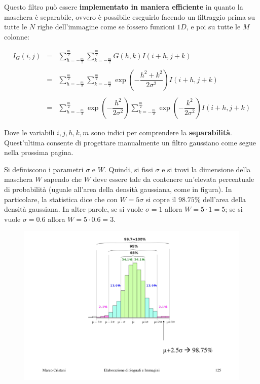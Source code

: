 \documentclass[a4paper]{article}
\begin{document}
	\noindent
	Questo filtro può essere \textbf{implementato in maniera efficiente} in quanto la maschera è separabile, ovvero è possibile eseguirlo facendo un filtraggio prima su tutte le $N$ righe dell'immagine come se fossero funzioni $1D$, e poi su tutte le $M$ colonne:
	
	\begin{equation*}
		\begin{array}{lll}
			I_{G}\left(i,j\right) & = & \displaystyle\sum_{h = -\frac{m}{2}}^{\frac{m}{2}} \displaystyle\sum_{k = -\frac{m}{2}}^{\frac{m}{2}} G\left(h,k\right) I\left(i+h, j+k\right) \\
			&& \\
			& = & \displaystyle\sum_{h = -\frac{m}{2}}^{\frac{m}{2}} \displaystyle\sum_{k = -\frac{m}{2}}^{\frac{m}{2}} \exp\left(-\dfrac{h^{2} + k^{2}}{2\sigma^{2}}\right) I\left(i+h, j+k\right) \\
			&& \\
			& = & \displaystyle\sum_{h = -\frac{m}{2}}^{\frac{m}{2}} \exp\left(-\dfrac{h^{2}}{2\sigma^{2}}\right) \displaystyle\sum_{k = - \frac{m}{2}}^{\frac{m}{2}} \exp\left(-\dfrac{k^{2}}{2\sigma^{2}}\right) I\left(i+h, j+k\right)
		\end{array}
	\end{equation*}

	\noindent
	Dove le variabili $i,j,h,k,m$ sono indici per comprendere la \textbf{separabilità}. Quest'ultima consente di progettare manualmente un filtro gaussiano come segue nella prossima pagina.
	
	\newpage
	
	\noindent
	Si definiscono i parametri $\sigma$ e $W$. Quindi, si fissi $\sigma$ e si trovi la dimensione della maschera $W$ sapendo che $W$ deve essere tale da contenere un'elevata percentuale di probabilità (uguale all'area della densità gaussiana, come in figura). In particolare, la statistica dice che con $W = 5\sigma$ si copre il $98.75\%$ dell'area della densità gaussiana. In altre parole, se si vuole $\sigma = 1$ allora $W = 5 \cdot 1 = 5$; se si vuole $\sigma = 0.6$ allora $W = 5 \cdot 0.6 = 3$.
	
	\begin{figure}[!htp]
		\centering
		\includegraphics[width=\textwidth]{img/filtro_gaussiano.pdf}
	\end{figure}
\end{document}
